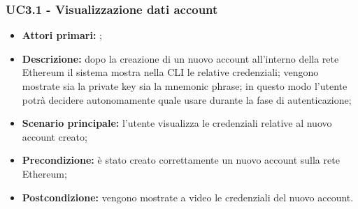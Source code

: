 \subsubsection{UC3.1 - Visualizzazione dati account}
\begin{itemize}
	\item \textbf{Attori primari:} \una{};
	\item \textbf{Descrizione:} dopo la creazione di un nuovo account all’interno della rete Ethereum il sistema mostra nella CLI le relative credenziali; vengono mostrate sia la private key sia la mnemonic phrase; in questo modo l’utente potrà decidere autonomamente quale usare durante la fase di autenticazione;
	\item \textbf{Scenario principale:} l’utente visualizza le credenziali relative al nuovo account creato;  
	\item \textbf{Precondizione:} è stato creato correttamente un nuovo account sulla rete Ethereum;   
	\item \textbf{Postcondizione:}  vengono mostrate a video le credenziali del nuovo account.  
\end{itemize}